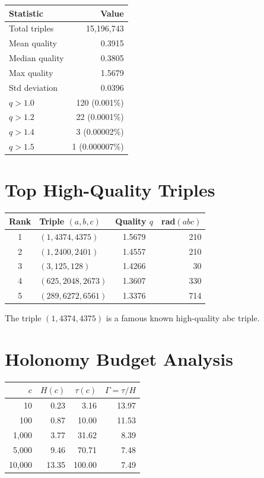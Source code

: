 \documentclass[12pt]{article}
\begin{document}
\begin{center}
\begin{tabular}{lr}
\toprule
\textbf{Statistic} & \textbf{Value} \\
\midrule
Total triples & 15,196,743 \\
Mean quality & 0.3915 \\
Median quality & 0.3805 \\
Max quality & 1.5679 \\
Std deviation & 0.0396 \\
\midrule
$q > 1.0$ & 120 (0.001\%) \\
$q > 1.2$ & 22 (0.0001\%) \\
$q > 1.4$ & 3 (0.00002\%) \\
$q > 1.5$ & 1 (0.000007\%) \\
\bottomrule
\end{tabular}
\end{center}

\section{Top High-Quality Triples}

\begin{center}
\begin{tabular}{clcr}
\toprule
\textbf{Rank} & \textbf{Triple $(a, b, c)$} & \textbf{Quality $q$} & \textbf{rad$(abc)$} \\
\midrule
1 & $(1, 4374, 4375)$ & 1.5679 & 210 \\
2 & $(1, 2400, 2401)$ & 1.4557 & 210 \\
3 & $(3, 125, 128)$ & 1.4266 & 30 \\
4 & $(625, 2048, 2673)$ & 1.3607 & 330 \\
5 & $(289, 6272, 6561)$ & 1.3376 & 714 \\
\bottomrule
\end{tabular}
\end{center}

\noindent The triple $(1, 4374, 4375)$ is a famous known high-quality abc triple.

\section{Holonomy Budget Analysis}

\begin{center}
\begin{tabular}{rrrr}
\toprule
$c$ & $H(c)$ & $\tau(c)$ & $\Gamma = \tau/H$ \\
\midrule
10 & 0.23 & 3.16 & 13.97 \\
100 & 0.87 & 10.00 & 11.53 \\
1,000 & 3.77 & 31.62 & 8.39 \\
5,000 & 9.46 & 70.71 & 7.48 \\
10,000 & 13.35 & 100.00 & 7.49 \\
\bottomrule
\end{tabular}
\end{center}
\end{document}
